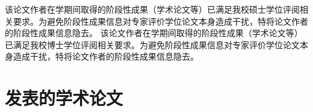 \begin{resume}
\ifreview

\ifismaster
该论文作者在学期间取得的阶段性成果（学术论文等）已满足我校硕士学位评阅相关要求。为避免阶段性成果信息对专家评价学位论文本身造成干扰，特将论文作者的阶段性成果信息隐去。
\else
该论文作者在学期间取得的阶段性成果（学术论文等）已满足我校博士学位评阅相关要求。为避免阶段性成果信息对专家评价学位论文本身造成干扰，特将论文作者的阶段性成果信息隐去。
\fi

\else

\ifisresumebib

	\begin{refsection}
	\setcounter{gbnamefmtcase}{1}%
	\nocite{ref-1-1-Yang,ref-2-1-杨轶,ref-3-1-杨轶,ref-4-1-Yang,ref-5-1-Wu,ref-6-1-贾泽,ref-7-1-伍晓明}
	
	\setlength{\biblabelsep}{12pt}
	\printbibliography[env=resumebib,heading=subbibliography,title={发表的学术论文}] %

	\end{refsection}


	\begin{refsection}
	\setcounter{gbnamefmtcase}{1}%
	\nocite{ref-8-1-任天令,ref-9-1-Ren}%
	
	\setlength{\biblabelsep}{12pt}
	\printbibliography[env=resumebib,heading=subbibliography,title={研究成果}]

	\end{refsection}

\else

  \section*{发表的学术论文} %


\end{resume}
